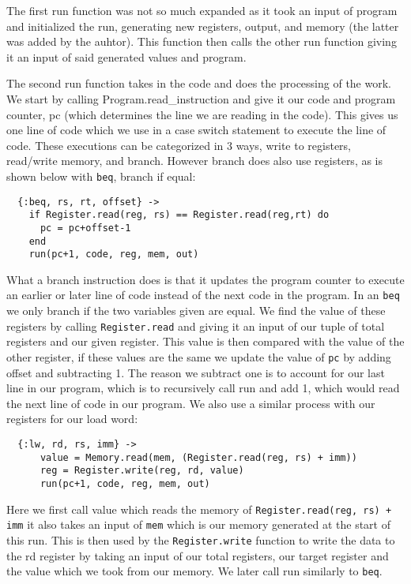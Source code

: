 \documentclass[a4paper,11pt]{article}
\begin{document}
The first run function was not so much expanded as it took an input of program and initialized the run, generating new registers, output, and memory (the latter was added by the auhtor). This function then calls the other run function giving it an input of said generated values and program. 

The second run function takes in the code and does the processing of the work. We start by calling Program.read\_instruction and give it our code and program counter, pc (which determines the line we are reading in the code). This gives us one line of code which we use in a case switch statement to execute the line of code. These executions can be categorized in 3 ways, write to registers, read/write memory, and branch. However branch does also use registers, as is shown below with {\tt beq}, branch if equal:

\begin{verbatim}
  {:beq, rs, rt, offset} ->
    if Register.read(reg, rs) == Register.read(reg,rt) do
      pc = pc+offset-1
    end
    run(pc+1, code, reg, mem, out)
\end{verbatim}

What a branch instruction does is that it updates the program counter to execute an earlier or later line of code instead of the next code in the program. In an {\tt beq} we only branch if the two variables given are equal. We find the value of these registers by calling {\tt Register.read} and giving it an input of our tuple of total registers and our given register. This value is then compared with the value of the other register, if these values are the same we update the value of {\tt pc} by adding offset and subtracting 1. The reason we subtract one is to account for our last line in our program, which is to recursively call run and add 1, which would read the next line of code in our program. We also use a similar process with our registers for our load word:

\begin{verbatim}
  {:lw, rd, rs, imm} ->
	  value = Memory.read(mem, (Register.read(reg, rs) + imm))
	  reg = Register.write(reg, rd, value)
	  run(pc+1, code, reg, mem, out)
\end{verbatim}

Here we first call value which reads the memory of {\tt Register.read(reg, rs) + imm} it also takes an input of {\tt mem} which is our memory generated at the start of this run. This is then used by the {\tt Register.write} function to write the data to the rd register by taking an input of our total registers, our target register and the value which we took from our memory. We later call run similarly to {\tt beq}.
\end{document}
